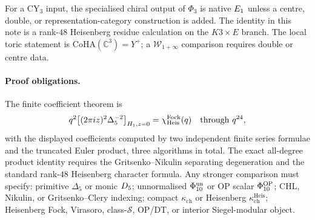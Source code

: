 For a CY$_3$ input, the specialised chiral output of $\Phi_3$ is native
$E_1$ unless a centre, double, or representation-category construction
is added. The identity in this note is a rank-$48$ Heisenberg residue
calculation on the \(K3\times E\) branch. The local toric statement is
\(\mathrm{CoHA}(\mathbb C^3)=Y^+\); a
\(\mathcal W_{1+\infty}\) comparison requires double or centre data.

\paragraph{Proof obligations.}
The finite coefficient theorem is
\[
  q^2\bigl[(2\pi i z)^2\Delta_5^{-2}\bigr]_{H_1,z=0}
  =
  \chi_{\mathrm{Heis}}^{\mathrm{Fock}}(q)
  \quad \text{through }q^{24},
\]
with the displayed coefficients computed by two independent finite
series formulae and the truncated Euler product, three algorithms in
total. The exact all-degree product identity requires the
Gritsenko--Nikulin separating degeneration and the standard rank-$48$
Heisenberg character formula. Any stronger
comparison must specify: primitive \(\Delta_5\) or monic \(D_5\);
unnormalised \(\Phi_{10}^{\mathrm{un}}\) or OP scalar \(\Phi_{10}^{\mathrm{OP}}\); CHL, Nikulin, or
Gritsenko--Clery indexing; compact \(\kappa_{\mathrm{ch}}\) or
Heisenberg \(\kappa_{\mathrm{ch}}^{\mathrm{Heis}}\); Heisenberg Fock,
Virasoro, class-\(\mathcal S\), OP/DT, or interior Siegel-modular object.
